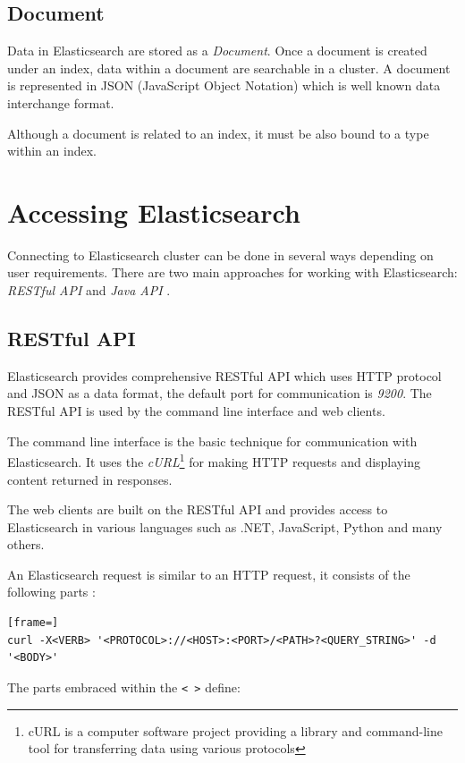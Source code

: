 \documentclass[12pt,oneside]{fithesis2}
\begin{document}
\subsection{Document}
Data in Elasticsearch are stored as a \textit{Document}. Once a document is created under an index, data within a document are searchable in a cluster. A document is represented in JSON (JavaScript Object Notation) which is well known data interchange format.

Although a document is related to an index, it must be also bound to a type within an index.

\section{Accessing Elasticsearch}
Connecting to Elasticsearch cluster can be done in several ways depending on user requirements. There are two main approaches for working with Elasticsearch: \textit{RESTful API} and \textit{Java API} \cite[Talking to Elasticsearch]{elasticsearch_defnitive_guide}.

\subsection{RESTful API}
Elasticsearch provides comprehensive RESTful API which uses HTTP protocol and JSON as a data format, the default port for communication is \textit{9200}. The RESTful API is used by the command line interface and web clients.

The command line interface is the basic technique for communication with Elasticsearch. It uses the \textit{cURL}\footnote{cURL is a computer software project providing a library and command-line tool for transferring data using various protocols} for making HTTP requests and displaying content returned in responses.

The web clients are built on the RESTful API and provides access to Elasticsearch in various languages such as .NET, JavaScript, Python and many others.

An Elasticsearch request is similar to an HTTP request, it consists of the following parts \cite[Talking to Elasticsearch]{elasticsearch_defnitive_guide}:

\begin{lstlisting}[frame=]
curl -X<VERB> '<PROTOCOL>://<HOST>:<PORT>/<PATH>?<QUERY_STRING>' -d '<BODY>'
\end{lstlisting}

The parts embraced within the \verb|< >| define:
\end{document}
